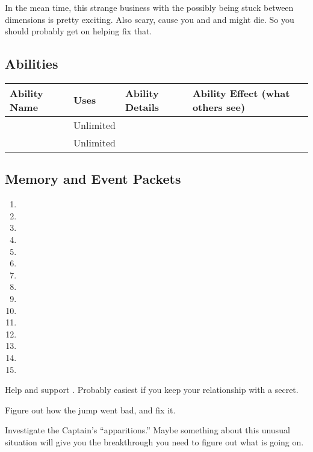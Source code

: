 \documentclass[char]{TMFHope}
\begin{document}
In the mean time, this strange business with the \pNew{} possibly being stuck between dimensions is pretty exciting. Also scary, cause you and \cMed{} and \cXO{} might die. So you should probably get on helping fix that.

\subsection*{Abilities}
\begin{tabular}{|p{3cm}|p{1.5cm}|p{8cm}|p{3.5cm}|} 
 \hline
 \textbf{Ability Name} & \textbf{Uses} & \textbf{Ability Details} & \textbf{Ability Effect (what others see)} \\ 
\hline
 \aEngineering{\MYname} & Unlimited & \aEngineering{\MYtext} & \aEngineering{\MYeffect}\\ 
 \hline
	\aPractice{\MYname} & Unlimited & \aPractice{\MYtext} & \aPractice{\MYeffect} \\ 
\hline
\end{tabular}

\subsection*{Memory and Event Packets}
\begin{enumerate}
	\item \mPractice{\MYname}
	\item \mSciOne{\MYname}
	\item \mSciTwo{\MYname}
	\item \mSciThree{\MYname}
	\item \mSciFour{\MYname}
	\item \mSciFive{\MYname}
	\item \mSciSix{\MYname}
	\item \mSciSeven{\MYname}
	\item \mBroom{\MYname}
	\item \mLab{\MYname}
	\item \mPatient{\MYname}
	\item \mKitchen{\MYname}
	\item \mWeight{\MYname}
	\item \mTheater{\MYname}
	\item \mCrates{\MYname}
\end{enumerate}

\begin{itemz}[Goals]
	\item Help and support \cXO{}. Probably easiest if you keep your relationship with \cXO{\them} a secret.
	\item Figure out how the jump went bad, and fix it.
	\item Investigate the Captain's ``apparitions.''  Maybe something about this unusual situation will give you the breakthrough you need to figure out what is going on.
\end{itemz}
\end{document}
